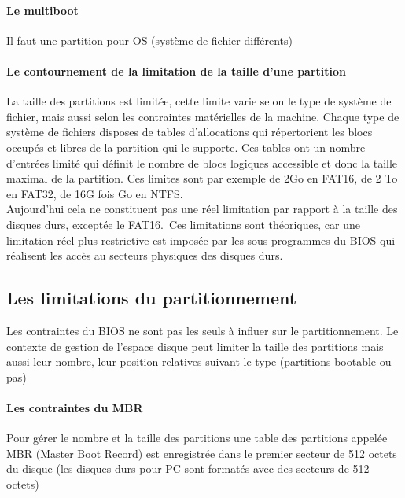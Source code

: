 \documentclass[12pt,a4paper,openany]{book}
\begin{document}
			\paragraph{Le multiboot}
				Il faut une partition pour OS (système de fichier différents) 
			\paragraph{Le contournement de la limitation de la taille d'une
				partition}
				La taille des partitions est limitée, cette limite varie selon 
				le type de système de fichier, mais aussi selon les contraintes
				matérielles de la machine. Chaque type de système de fichiers 
				disposes de tables d'allocations qui répertorient les blocs 
				occupés et libres de la partition qui le supporte. 
				Ces tables ont un nombre d'entrées limité qui définit le nombre
				de blocs logiques accessible et donc la taille maximal de la 
				partition. Ces limites sont par exemple de 2Go en FAT16, de
				2 To en FAT32, de 16G fois Go en NTFS.\\
				Aujourd'hui cela ne constituent pas une réel limitation par 
				rapport à la taille des disques durs, exceptée le FAT16.\
				Ces limitations sont théoriques, car une limitation réel
				plus restrictive est imposée par les sous programmes du BIOS
				qui réalisent les accès au secteurs physiques des disques durs.
			\subsection{Les limitations du partitionnement}
				Les contraintes du BIOS ne sont pas les seuls à influer sur
				le partitionnement. Le contexte de gestion de l'espace disque
				peut limiter la taille des partitions mais aussi leur nombre, 
				leur position relatives suivant le type (partitions bootable 
						ou pas)
				\paragraph{Les contraintes du MBR}
					Pour gérer le nombre et la taille des partitions une table des 
					partitions appelée MBR (Master Boot Record) est enregistrée
					dans le premier secteur de 512 octets du disque (les disques 
							durs pour PC sont formatés avec des secteurs de 512 octets)
\end{document}
